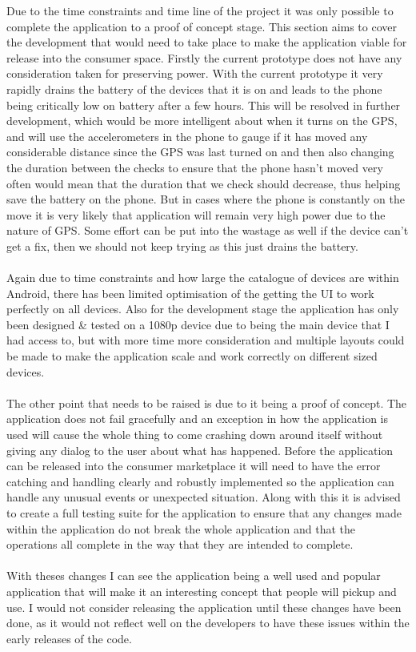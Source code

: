 Due to the time constraints and time line of the project it was only possible to complete the application to a proof of concept stage. This section aims to cover the development that would need to take place to make the application viable for release into the consumer space. Firstly the current prototype does not have any consideration taken for preserving power. With the current prototype it very rapidly drains the battery of the devices that it is on and leads to the phone being critically low on battery after a few hours. This will be resolved in further development, which would be more intelligent about when it turns on the GPS, and will use the accelerometers in the phone to gauge if it has moved any considerable distance since the GPS was last turned on and then also changing the duration between the checks to ensure that the phone hasn't moved very often would mean that the duration that we check should decrease, thus helping save the battery on the phone. But in cases where the phone is constantly on the move it is very likely that application will remain very high power due to the nature of GPS. Some effort can be put into the wastage as well if the device can't get a fix, then we should not keep trying as this just drains the battery.\\
\\
Again due to time constraints and how large the catalogue of devices are within Android, there has been limited optimisation of the getting the UI to work perfectly on all devices. Also for the development stage the application has only been designed \& tested on a 1080p device due to being the main device that I had access to, but with more time more consideration and multiple layouts could be made to make the application scale and work correctly on different sized devices.\\
\\
The other point that needs to be raised is due to it being a proof of concept. The application does not fail gracefully and an exception in how the application is used will cause the whole thing to come crashing down around itself without giving any dialog to the user about what has happened. Before the application can be released into the consumer marketplace it will need to have the error catching and handling clearly and robustly implemented so the application can handle any unusual events or unexpected situation. Along with this it is advised to create a full testing suite for the application to ensure that any changes made within the application do not break the whole application and that the operations all complete in the way that they are intended to complete.\\
\\
With theses changes I can see the application being a well used and popular application that will make it an interesting concept that people will pickup and use. I would not consider releasing the application until these changes have been done, as it would not reflect well on the developers to have these issues within the early releases of the code.\\

